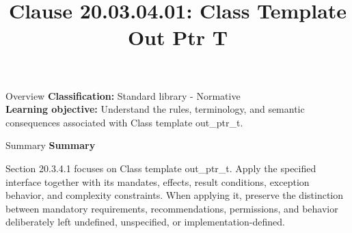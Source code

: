 \documentclass[10pt,letterpaper]{article}
\title{Clause 20.03.04.01: Class Template Out Ptr T}
\author{}
\date{}
\begin{document}
\maketitle
\begin{CornellOverviewBox}{Overview}
\textbf{Classification:} Standard library - Normative\\[2pt]
\textbf{Learning objective:} Understand the rules, terminology, and semantic consequences associated with Class template out\_ptr\_t.
\end{CornellOverviewBox}\begin{CornellSummaryBox}{Summary}
{\sffamily\bfseries\color{Accent} Summary}\par\vspace{3pt}Section 20.3.4.1 focuses on Class template out\_ptr\_t. Apply the specified interface together with its mandates, effects, result conditions, exception behavior, and complexity constraints. When applying it, preserve the distinction between mandatory requirements, recommendations, permissions, and behavior deliberately left undefined, unspecified, or implementation-defined.
\end{CornellSummaryBox}
\end{document}
